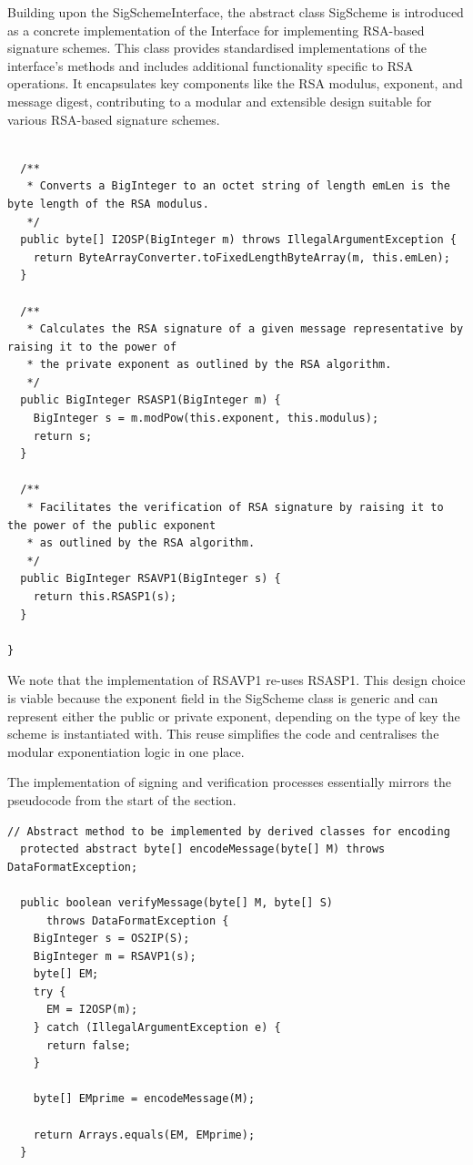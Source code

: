 \documentclass[]{final_report}
\theoremstyle{definition}
\begin{document}
Building upon the SigSchemeInterface, the abstract class SigScheme is introduced as a concrete implementation of the Interface for implementing RSA-based signature schemes. This class provides standardised implementations of the interface's methods and 
includes additional functionality specific to RSA operations. It encapsulates key components like the RSA modulus, exponent, and message digest, contributing to a modular and extensible design suitable for various RSA-based signature schemes.

\begin{lstlisting}[caption=Implementation of RSA primitives]

  /**
   * Converts a BigInteger to an octet string of length emLen is the byte length of the RSA modulus.
   */
  public byte[] I2OSP(BigInteger m) throws IllegalArgumentException {
    return ByteArrayConverter.toFixedLengthByteArray(m, this.emLen);
  }

  /**
   * Calculates the RSA signature of a given message representative by raising it to the power of
   * the private exponent as outlined by the RSA algorithm.
   */
  public BigInteger RSASP1(BigInteger m) {
    BigInteger s = m.modPow(this.exponent, this.modulus);
    return s;
  }

  /**
   * Facilitates the verification of RSA signature by raising it to the power of the public exponent
   * as outlined by the RSA algorithm.
   */
  public BigInteger RSAVP1(BigInteger s) {
    return this.RSASP1(s);
  }

}
 \end{lstlisting}
We note that the implementation of RSAVP1 re-uses RSASP1. This design choice is viable because the exponent field in the SigScheme class is generic and can represent either the public or private exponent, depending on the type of key the scheme is instantiated with. This reuse simplifies the code and centralises the modular exponentiation logic in one place.
 
The implementation of signing and verification processes essentially mirrors the pseudocode from the start of the section. 

\begin{lstlisting}[caption=Signature Scheme specialisation methods]
  // Abstract method to be implemented by derived classes for encoding
  protected abstract byte[] encodeMessage(byte[] M) throws DataFormatException;

  public boolean verifyMessage(byte[] M, byte[] S)
      throws DataFormatException {
    BigInteger s = OS2IP(S);
    BigInteger m = RSAVP1(s);
    byte[] EM;
    try {
      EM = I2OSP(m);
    } catch (IllegalArgumentException e) {
      return false;
    }

    byte[] EMprime = encodeMessage(M);

    return Arrays.equals(EM, EMprime);
  }
 \end{lstlisting}
 
\end{document}
